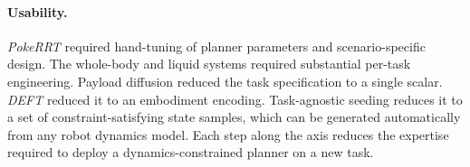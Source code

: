 \paragraph{Usability.}
\textit{PokeRRT} required hand-tuning of planner parameters and scenario-specific design.
The whole-body and liquid systems required substantial per-task engineering.
Payload diffusion reduced the task specification to a single scalar.
\textit{DEFT} reduced it to an embodiment encoding.
Task-agnostic seeding reduces it to a set of constraint-satisfying state samples, which can be generated automatically from any robot dynamics model.
Each step along the axis reduces the expertise required to deploy a dynamics-constrained planner on a new task.